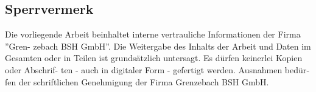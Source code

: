 \newpage
\begin{otherlanguage}{ngerman}
\thispagestyle{empty}
\section*{Sperrvermerk}
\thispagestyle{empty}
Die vorliegende Arbeit beinhaltet interne vertrauliche Informationen der Firma ”Gren-
zebach BSH GmbH”. Die Weitergabe des Inhalts der Arbeit und Daten im Gesamten
oder in Teilen ist grundsätzlich untersagt.
Es dürfen keinerlei Kopien oder Abschrif-
ten - auch in digitaler Form - gefertigt werden.
Ausnahmen bedürfen der schriftlichen
Genehmigung der Firma Grenzebach BSH GmbH.
\vspace{4\baselineskip}\\
\end{otherlanguage}